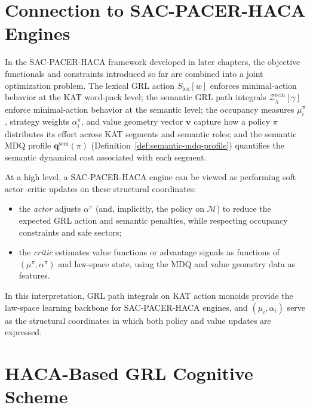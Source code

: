 \documentclass[11pt]{book}
\theoremstyle{plain}
\theoremstyle{definition}
\theoremstyle{remark}
\begin{document}
\section[Connection to SAC-PACER-HACA Engines]{Connection to SAC-PACER-HACA Engines}


In the SAC-PACER-HACA framework developed in later chapters, the
objective functionals and constraints introduced so far are combined
into a joint optimization problem. The lexical GRL action
$S_{\mathrm{lex}}[w]$ enforces minimal-action behavior at the KAT
word-pack level; the semantic GRL path integrals
$\mathcal{Z}^{\mathrm{sem}}_\chi[\gamma]$ enforce minimal-action
behavior at the semantic level; the occupancy measures $\mu_i^\pi$,
strategy weights $\alpha_i^\pi$, and value geometry vector
$\mathbf{v}$ capture how a policy $\pi$ distributes its effort across
KAT segments and semantic roles; and the semantic MDQ profile
$\mathbf{q}^{\mathrm{sem}}(\pi)$
(Definition~\ref{def:semantic-mdq-profile})
quantifies the semantic dynamical cost associated with each segment.

At a high level, a SAC-PACER-HACA engine can be viewed as performing
soft actor–critic updates on these structural coordinates:
\begin{itemize}
  \item the \emph{actor} adjusts $\alpha^\pi$ (and, implicitly, the
        policy on $\mathcal{M}$) to reduce the expected GRL action and
        semantic penalties, while respecting occupancy constraints and
        safe sectors;
  \item the \emph{critic} estimates value functions or advantage
        signals as functions of $(\mu^\pi,\alpha^\pi)$ and law-space
        state, using the MDQ and value geometry data as features.
\end{itemize}
In this interpretation, GRL path integrals on KAT action monoids
provide the law-space learning backbone for SAC-PACER-HACA engines,
and $(\mu_i,\alpha_i)$ serve as the structural coordinates in which
both policy and value updates are expressed.

\section[HACA-Based GRL Cognitive Scheme]{HACA-Based GRL Cognitive Scheme}
\end{document}
